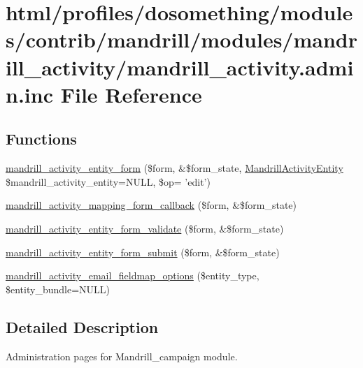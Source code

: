 \hypertarget{mandrill__activity_8admin_8inc}{
\section{html/profiles/dosomething/modules/contrib/mandrill/modules/mandrill\_\-activity/mandrill\_\-activity.admin.inc File Reference}
\label{mandrill__activity_8admin_8inc}
}
\subsection*{Functions}
\begin{DoxyCompactItemize}
\item 
\hyperlink{mandrill__activity_8admin_8inc_a8cddf760b276121f239c2ef5022372d1}{mandrill\_\-activity\_\-entity\_\-form} (\$form, \&\$form\_\-state, \hyperlink{classMandrillActivityEntity}{MandrillActivityEntity} \$mandrill\_\-activity\_\-entity=NULL, \$op= 'edit')
\item 
\hyperlink{mandrill__activity_8admin_8inc_aae042db631ccc76e4d915e2fe7018aad}{mandrill\_\-activity\_\-mapping\_\-form\_\-callback} (\$form, \&\$form\_\-state)
\item 
\hyperlink{mandrill__activity_8admin_8inc_afb6aafdfef05226643d5a437488945db}{mandrill\_\-activity\_\-entity\_\-form\_\-validate} (\$form, \&\$form\_\-state)
\item 
\hyperlink{mandrill__activity_8admin_8inc_a93e709e127ee25c795a65fcbe13448f0}{mandrill\_\-activity\_\-entity\_\-form\_\-submit} (\$form, \&\$form\_\-state)
\item 
\hyperlink{mandrill__activity_8admin_8inc_a7d6b22f7626200011561acf11e8b3f24}{mandrill\_\-activity\_\-email\_\-fieldmap\_\-options} (\$entity\_\-type, \$entity\_\-bundle=NULL)
\end{DoxyCompactItemize}


\subsection{Detailed Description}
Administration pages for Mandrill\_\-campaign module. 

